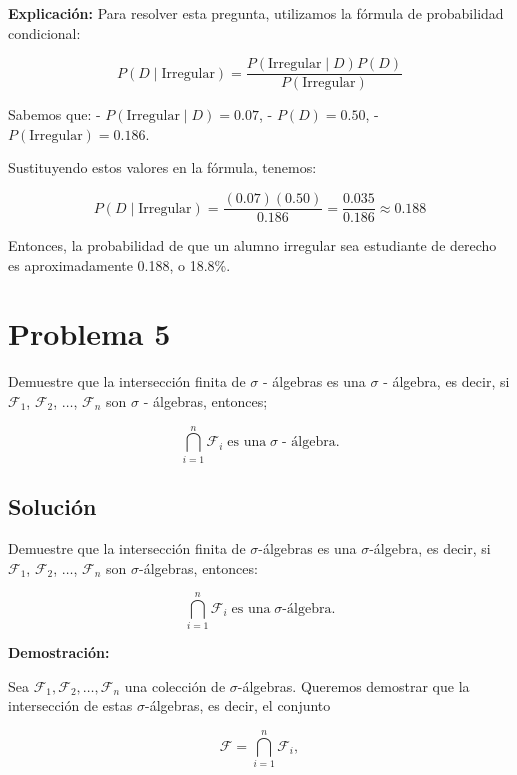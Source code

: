 \documentclass[titlepage]{article} %
\begin{document}
\begin{enumerate}
    \textbf{Explicación:}  
    Para resolver esta pregunta, utilizamos la fórmula de probabilidad condicional:
    
    \[
    P(D \mid \text{Irregular}) = \frac{P(\text{Irregular} \mid D) P(D)}{P(\text{Irregular})}
    \]
    
    Sabemos que:
    - \( P(\text{Irregular} \mid D) = 0.07 \),
    - \( P(D) = 0.50 \),
    - \( P(\text{Irregular}) = 0.186 \).
    
    Sustituyendo estos valores en la fórmula, tenemos:
    
    \[
    P(D \mid \text{Irregular}) = \frac{(0.07)(0.50)}{0.186} = \frac{0.035}{0.186} \approx 0.188
    \]
    
    Entonces, la probabilidad de que un alumno irregular sea estudiante de derecho es aproximadamente 0.188, o 18.8\%.

\end{enumerate}

    \section*{\Large Problema 5}

\Large Demuestre que la intersección finita de $\sigma$ - álgebras es una $\sigma$ - álgebra, es decir, si $\mathcal{F}_{1}$, $\mathcal{F}_2$, $\dots$, $\mathcal{F}_{n}$ son $\sigma$ - álgebras, entonces;

    \[\bigcap_{i = 1}^{n} \mathcal{F}_{i} \; \text{es una} \; \sigma \; \text{- álgebra.}\]

\subsection*{\Large Solución}

\Large
Demuestre que la intersección finita de $\sigma$-álgebras es una $\sigma$-álgebra, es decir, si $\mathcal{F}_{1}$, $\mathcal{F}_2$, $\dots$, $\mathcal{F}_{n}$ son $\sigma$-álgebras, entonces:

\[
\bigcap_{i = 1}^{n} \mathcal{F}_{i} \; \text{es una} \; \sigma\text{-álgebra.}
\]

\textbf{Demostración:}

Sea $\mathcal{F}_{1}, \mathcal{F}_{2}, \dots, \mathcal{F}_{n}$ una colección de $\sigma$-álgebras. Queremos demostrar que la intersección de estas $\sigma$-álgebras, es decir, el conjunto

\[
\mathcal{F} = \bigcap_{i = 1}^{n} \mathcal{F}_{i},
\]
\end{document}
